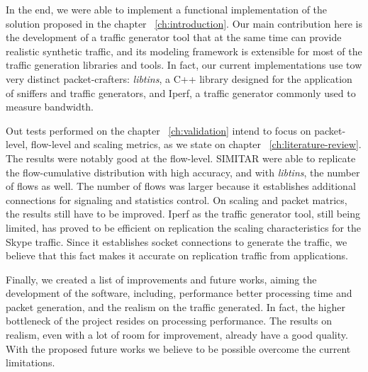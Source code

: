 In the end, we were able to implement a functional implementation of the solution proposed in the chapter ~\ref{ch:introduction}. Our main contribution here is the development of a traffic generator tool that at the same time can provide realistic synthetic traffic, and its modeling framework is extensible for most of the traffic generation libraries and tools. In fact, our current implementations use tow very distinct packet-crafters: \textit{libtins}, a C++ library designed for the application of sniffers and traffic generators, and Iperf, a traffic generator commonly used to measure bandwidth. 


Out tests performed on the chapter ~\ref{ch:validation} intend to focus on packet-level, flow-level and scaling metrics, as we state on chapter ~\ref{ch:literature-review}. The results were notably good at the flow-level. SIMITAR were able to replicate the flow-cumulative distribution with high accuracy, and with \textit{libtins}, the number of flows as well. The number of flows was larger because it establishes additional connections for signaling and statistics control. On scaling and packet matrics, the results still have to be improved. Iperf as the traffic generator tool, still being limited, has proved to be efficient on replication the scaling characteristics for the Skype traffic. Since it establishes socket connections to generate the traffic, we believe that this fact makes it accurate on replication traffic from applications. 


Finally, we created a list of improvements and future works, aiming the development of the software, including, performance better processing time and packet generation, and the realism on the traffic generated. In fact, the higher bottleneck of the project resides on processing performance. The results on realism, even with a lot of room for improvement, already have a good quality. With the proposed future works we believe to be possible overcome the current limitations.



